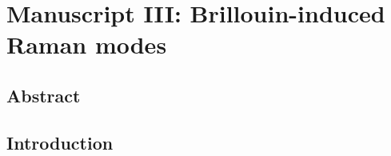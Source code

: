 \setcounter{rownumber}{0}
\singlespacing
\chapter{Manuscript III: Brillouin-induced Raman modes}
\label{chap:chapterIII}
\acresetall


%

%

\doublespacing


\section{Abstract}
\lipsum[2]


\section{Introduction}
\lipsum[2]

